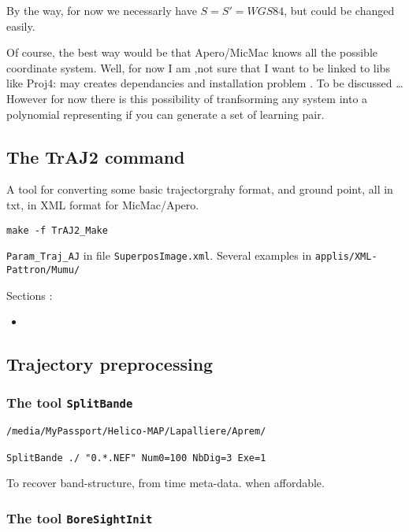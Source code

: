 By the way, for now we necessarly have $S=S'=WGS84$, but could be changed easily.


Of course, the best way would be that Apero/MicMac knows all the possible coordinate system.
Well, for now I am ,not sure that I want to be linked to libs like Proj4: may
creates dependancies and installation problem  .  To be discussed \dots However
for now there is this possibility of tranfsorming any system into a polynomial
representing if you can generate a set of learning pair.


\subsection{The TrAJ2 command}

A tool for converting some basic trajectorgrahy format, and ground point,
all in txt, in XML format for MicMac/Apero.


{\tt make -f TrAJ2\_Make}

{\tt Param\_Traj\_AJ} in file {\tt SuperposImage.xml}. Several examples in
{\tt applis/XML-Pattron/Mumu/}



Sections :

\begin{itemize}
   \item 
\end{itemize}


\subsection{Trajectory preprocessing}

\subsubsection{The tool {\tt SplitBande}}


\begin{verbatim}
/media/MyPassport/Helico-MAP/Lapalliere/Aprem/

SplitBande ./ "0.*.NEF" Num0=100 NbDig=3 Exe=1
\end{verbatim}





To recover band-structure, from time meta-data. when affordable.


\subsubsection{The tool {\tt BoreSightInit}}











